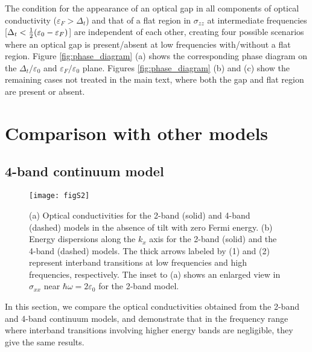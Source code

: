 \documentclass[aps,twocolumn,floatfix]{revtex4-1}
\begin{document}
The condition for the appearance of an optical gap in all components of optical conductivity ($\varepsilon_{F}>\Delta_{t}$) and that of a flat region in $\sigma_{zz}$ at intermediate frequencies [$\Delta_{t}<{1\over 2}(\varepsilon_0-\varepsilon_{F})$] are independent of each other, creating four possible scenarios where an optical gap is present/absent at low frequencies with/without a flat region. Figure \ref{fig:phase_diagram} (a) shows the corresponding phase diagram on the $\Delta_{t}/\varepsilon_0$  and $\varepsilon_{F}/\varepsilon_0$ plane. Figures \ref{fig:phase_diagram} (b) and (c) show the remaining cases not treated in the main text, where both the gap and flat region are present or absent.



\section{Comparison with other models}
\label{sec:model_comparison}
\subsection{4-band continuum model}

\begin{figure}[!htb]
\texttt{[image: figS2]}
\caption{
(a) Optical conductivities for the 2-band (solid)  and 4-band (dashed) models in the absence of tilt with zero Fermi energy. (b) Energy dispersions along the $k_x$ axis for the 2-band (solid) and the 4-band (dashed) models. The thick arrows labeled by (1) and (2) represent interband transitions at low frequencies and high frequencies, respectively. The inset to (a) shows an enlarged view in $\sigma_{xx}$ near $\hbar\omega=2\varepsilon_0$ for the 2-band model.
}
\label{fig:model_comparison_4band}
\end{figure}

In this section, we compare the optical conductivities obtained from the 2-band and 4-band continuum models, and demonstrate that in the frequency range where interband transitions involving higher energy bands are negligible, they give the same results.
\end{document}
